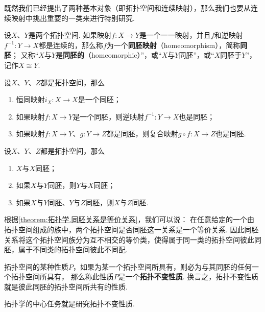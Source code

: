 既然我们已经提出了两种基本对象（即拓扑空间和连续映射），那么我们也要从连续映射中挑出重要的一类来进行特别研究.

\begin{definition}\label{definition:拓扑学.同胚映射的概念}
设\(X\)、\(Y\)是两个拓扑空间.
如果映射\(f\colon X \to Y\)是一个一一映射，并且\(f\)和逆映射\(f^{-1}\colon Y \to X\)都是连续的，那么称\(f\)为一个\textbf{同胚映射}（homeomorphism），简称\textbf{同胚}；
又称“\(X\)与\(Y\)是\textbf{同胚的}（homeomorphic）”，或“\(X\)与\(Y\)同胚”，或“\(X\)同胚于\(Y\)”，记作\(X \cong Y\).
\end{definition}

\begin{theorem}\label{theorem:拓扑学.同胚映射的性质}
设\(X\)、\(Y\)、\(Z\)都是拓扑空间，那么
\begin{enumerate}
\item 恒同映射\(i_X\colon X \to X\)是一个同胚；
\item 如果映射\(f\colon X \to Y\)是一个同胚，则逆映射\(f^{-1}\colon Y \to X\)也是同胚；
\item 如果映射\(f\colon X \to Y\)、\(g\colon Y \to Z\)都是同胚，则复合映射\(g \circ f\colon X \to Z\)也是同胚.
\end{enumerate}
\end{theorem}

\begin{theorem}\label{theorem:拓扑学.同胚关系是等价关系}
设\(X\)、\(Y\)、\(Z\)都是拓扑空间，那么
\begin{enumerate}
\item \(X\)与\(X\)同胚；
\item 如果\(X\)与\(Y\)同胚，则\(Y\)与\(X\)同胚；
\item 如果\(X\)与\(Y\)同胚、\(Y\)与\(Z\)同胚，则\(X\)与\(Z\)同胚.
\end{enumerate}
\end{theorem}
根据\cref{theorem:拓扑学.同胚关系是等价关系}，我们可以说：
在任意给定的一个由拓扑空间组成的族中，两个拓扑空间是否同胚这一关系是一个等价关系.
因此同胚关系将这个拓扑空间族分为互不相交的等价类，使得属于同一类的拓扑空间彼此同胚，属于不同类的拓扑空间彼此不同配.

拓扑空间的某种性质\(P\)，如果为某一个拓扑空间所具有，则必为与其同胚的任何一个拓扑空间所具有，%
那么称此性质\(P\)是一个\textbf{拓扑不变性质}.
换言之，拓扑不变性质就是彼此同胚的拓扑空间所共有的性质.

{\color{red} 拓扑学的中心任务就是研究拓扑不变性质.}

